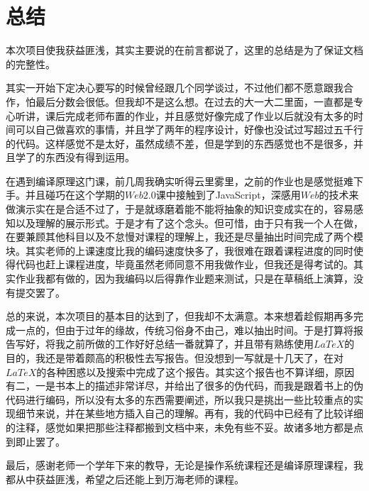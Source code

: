 \chapter{总结}

本次项目使我获益匪浅，其实主要说的在前言都说了，这里的总结是为了保证文档的完整性。

其实一开始下定决心要写的时候曾经跟几个同学谈过，不过他们都不愿意跟我合作，怕最后分数会很低。但我却不是这么想。在过去的大一大二里面，一直都是专心听讲，课后完成老师布置的作业，并且感觉好像完成了作业以后就没有太多的时间可以自己做喜欢的事情，并且学了两年的程序设计，好像也没试过写超过五千行的代码。这样感觉不是太好，虽然成绩不差，但是学到的东西感觉也不是很多，并且学了的东西没有得到运用。

在遇到编译原理这门课，前几周我确实听得云里雾里，之前的作业也是感觉挺难下手。并且碰巧在这个学期的$Web2.0$课中接触到了JavaScript，深感用$Web$的技术来做演示实在是合适不过了，于是就琢磨着能不能将抽象的知识变成实在的，容易感知以及理解的展示形式。于是才有了这个念头。但可惜，由于只有我一个人在做，在要兼顾其他科目以及不怠慢对课程的理解上，我还是尽量抽出时间完成了两个模块。其实老师的上课速度比我的编码速度快多了，我很难在跟着课程进度的同时使得代码也赶上课程进度，毕竟虽然老师同意不用我做作业，但我还是得考试的。其实作业我都有做的，因为我编码以后得靠作业题来测试，只是在草稿纸上演算，没有提交罢了。

总的来说，本次项目的基本目的达到了，但我却不太满意。本来想着趁假期再多完成一点的，但由于过年的缘故，传统习俗身不由己，难以抽出时间。于是打算将报告写好，将我之前所做的工作好好总结一番就算了，并且带有熟练使用$LaTeX$的目的，我还是带着颇高的积极性去写报告。但没想到一写就是十几天了，在对$LaTeX$的各种困惑以及搜索中完成了这个报告。其实这个报告也不算详细，原因有二，一是书本上的描述非常详尽，并给出了很多的伪代码，而我是跟着书上的伪代码进行编码，所以没有太多的东西需要阐述，所以我只是挑出一些比较重点的实现细节来说，并在某些地方插入自己的理解。再有，我的代码中已经有了比较详细的注释，感觉如果把那些注释都搬到文档中来，未免有些不妥。故诸多地方都是点到即止罢了。

最后，感谢老师一个学年下来的教导，无论是操作系统课程还是编译原理课程，我都从中获益匪浅，希望之后还能上到万海老师的课程。
